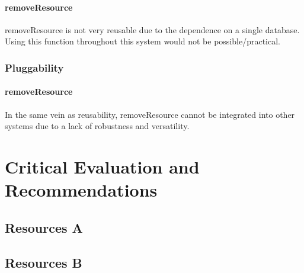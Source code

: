 \documentclass[a4paper]{article}
\begin{document}
\paragraph{removeResource}
removeResource is not very reusable due to the dependence on a single database. Using this function throughout this system would not be possible/practical.

\subsubsection {Pluggability}

\paragraph{removeResource}
In the same vein as reusability, removeResource cannot be integrated into other systems due to a lack of robustness and versatility.


\section {Critical Evaluation and Recommendations}
\subsection {Resources A}
\subsection {Resources B}

\end{document}
